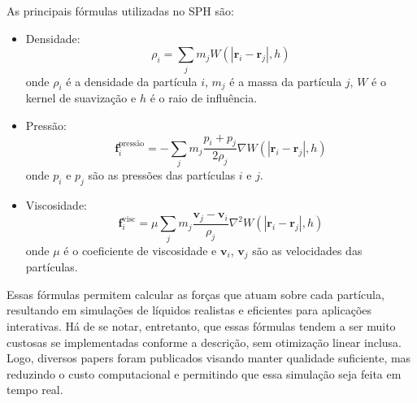 As principais fórmulas utilizadas no SPH são:

\begin{itemize}
  \item Densidade: $$
\rho_i = \sum_j m_j W(|\mathbf{r}_i - \mathbf{r}_j|, h)
$$
onde $\rho_i$ é a densidade da partícula $i$, $m_j$ é a massa da partícula $j$, $W$ é o kernel de suavização e $h$ é o raio de influência.

\item Pressão: $$
\mathbf{f}_i^{\text{pressão}} = -\sum_j m_j \frac{p_i + p_j}{2 \rho_j} \nabla W(|\mathbf{r}_i - \mathbf{r}_j|, h)
$$
onde $p_i$ e $p_j$ são as pressões das partículas $i$ e $j$.

\item Viscosidade: $$
\mathbf{f}_i^{\text{visc}} = \mu \sum_j m_j \frac{\mathbf{v}_j - \mathbf{v}_i}{\rho_j} \nabla^2 W(|\mathbf{r}_i - \mathbf{r}_j|, h) $$ onde $\mu$ é o coeficiente de viscosidade e $\mathbf{v}_i$, $\mathbf{v}_j$ são as velocidades das partículas.
\end{itemize}

Essas fórmulas permitem calcular as forças que atuam sobre cada partícula, resultando em simulações de líquidos realistas e eficientes para aplicações interativas. Há de se notar, entretanto, que essas fórmulas tendem a ser muito custosas se implementadas conforme a descrição, sem otimização linear inclusa. Logo, diversos papers foram publicados visando manter qualidade suficiente, mas reduzindo o custo computacional e permitindo que essa simulação seja feita em tempo real. 
